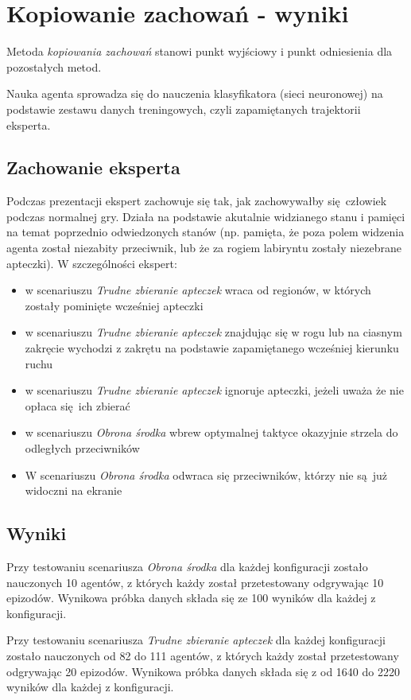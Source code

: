 \section{Kopiowanie zachowań - wyniki}\label{bc_results}
Metoda \textit{kopiowania zachowań} stanowi punkt wyjściowy i punkt odniesienia dla pozostałych metod.

Nauka agenta sprowadza się do nauczenia klasyfikatora (sieci neuronowej) na podstawie zestawu danych treningowych, czyli zapamiętanych trajektorii eksperta.


\subsection {Zachowanie eksperta}
Podczas prezentacji ekspert zachowuje się tak, jak zachowywałby się człowiek podczas normalnej gry. Działa na podstawie akutalnie widzianego stanu i pamięci na temat poprzednio odwiedzonych stanów (np. pamięta, że poza polem widzenia agenta został niezabity przeciwnik, lub że za rogiem labiryntu zostały niezebrane apteczki). W szczególności ekspert:
\begin{itemize}
\item{w scenariuszu \textit{Trudne zbieranie apteczek} wraca od regionów, w których zostały pominięte wcześniej apteczki}
\item{w scenariuszu \textit{Trudne zbieranie apteczek} znajdując się w rogu lub na ciasnym zakręcie wychodzi z zakrętu na podstawie zapamiętanego wcześniej kierunku ruchu}
\item{w scenariuszu \textit{Trudne zbieranie apteczek} ignoruje apteczki, jeżeli uważa że nie opłaca się ich zbierać}
\item{w scenariuszu \textit{Obrona środka} wbrew optymalnej taktyce okazyjnie strzela do odległych przeciwników}
\item{W scenariuszu \textit{Obrona środka} odwraca się przeciwników, którzy nie są już widoczni na ekranie}
\end{itemize}


\subsection{Wyniki}

Przy testowaniu scenariusza \textit{Obrona środka} dla każdej konfiguracji zostało nauczonych 10 agentów, z których każdy został przetestowany odgrywając 10 epizodów. Wynikowa próbka danych składa się ze 100 wyników dla każdej z konfiguracji.

Przy testowaniu scenariusza \textit{Trudne zbieranie apteczek} dla każdej konfiguracji zostało nauczonych od 82 do 111 agentów, z których każdy został przetestowany odgrywając 20 epizodów. Wynikowa próbka danych składa się z od 1640 do 2220 wyników dla każdej z konfiguracji.


